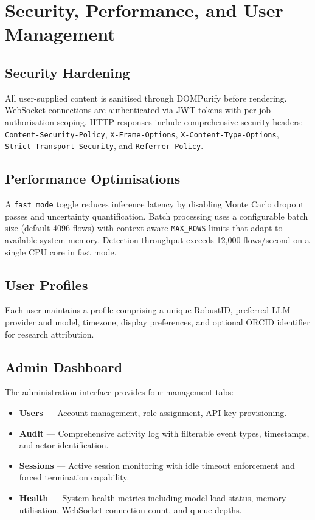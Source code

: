 \section{Security, Performance, and User Management}
\label{sec:security_performance}

\subsection{Security Hardening}
All user-supplied content is sanitised through DOMPurify before rendering.
WebSocket connections are authenticated via JWT tokens with per-job
authorisation scoping.  HTTP responses include comprehensive security
headers: \texttt{Content-Security-Policy}, \texttt{X-Frame-Options},
\texttt{X-Content-Type-Options}, \texttt{Strict-Transport-Security},
and \texttt{Referrer-Policy}.

\subsection{Performance Optimisations}
A \texttt{fast\_mode} toggle reduces inference latency by disabling Monte
Carlo dropout passes and uncertainty quantification.  Batch processing uses
a configurable batch size (default 4096 flows) with context-aware
\texttt{MAX\_ROWS} limits that adapt to available system memory.  Detection
throughput exceeds 12,000 flows/second on a single CPU core in fast mode.

\subsection{User Profiles}
Each user maintains a profile comprising a unique RobustID, preferred LLM
provider and model, timezone, display preferences, and optional ORCID
identifier for research attribution.

\subsection{Admin Dashboard}
The administration interface provides four management tabs:
\begin{itemize}
  \item \textbf{Users} --- Account management, role assignment, API key
        provisioning.
  \item \textbf{Audit} --- Comprehensive activity log with filterable
        event types, timestamps, and actor identification.
  \item \textbf{Sessions} --- Active session monitoring with idle timeout
        enforcement and forced termination capability.
  \item \textbf{Health} --- System health metrics including model load
        status, memory utilisation, WebSocket connection count, and
        queue depths.
\end{itemize}

